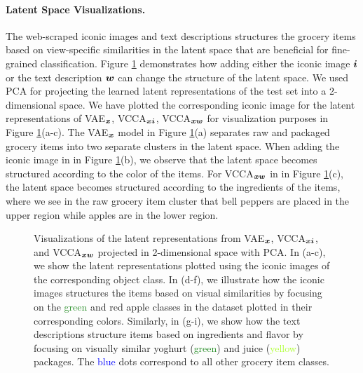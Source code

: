 \vspace{-3mm}
\paragraph{Latent Space Visualizations.} The web-scraped iconic images and text descriptions structures the grocery items based on view-specific similarities in the latent space that are beneficial for fine-grained classification. Figure \ref{fig:latent_space_visualizations} demonstrates how adding either the iconic image ${\bm{i}}$ or the text description ${\bm{w}}$ can change the structure of the latent space. We used PCA for projecting the learned latent representations of the test set into a 2-dimensional space. We have plotted the corresponding iconic image for the latent representations of VAE$_{{\bm{x}}}$, VCCA$_{{\bm{x}} {\bm{i}}}$, VCCA$_{{\bm{x}} {\bm{w}}}$ for visualization purposes in Figure \ref{fig:latent_space_visualizations}(a-c).  
The VAE$_{{\bm{x}}}$ model in Figure \ref{fig:latent_space_visualizations}(a) separates raw and packaged grocery items into two separate clusters in the latent space. 
When adding the iconic image in in Figure \ref{fig:latent_space_visualizations}(b), we observe that the latent space becomes structured according to the color of the items. 
For VCCA$_{{\bm{x}} {\bm{w}}}$ in in Figure \ref{fig:latent_space_visualizations}(c), the latent space becomes structured according to the ingredients of the items, where we see in the raw grocery item cluster that bell peppers are placed in the upper region while apples are in the lower region. 

\begin{figure}[t]
	\centering
	
	\vspace{-2mm}
	\caption{ Visualizations of the latent representations from VAE$_{\bm{x}}$, VCCA$_{{\bm{x}}{\bm{i}}}$, and VCCA$_{{\bm{x}}{\bm{w}}}$ projected in 2-dimensional space with PCA. In (a-c), we show the latent representations plotted using the iconic images of the corresponding object class. In (d-f), we illustrate how the iconic images structures the items based on visual similarities by focusing on the \textcolor{ForestGreen}{green} and \textcolor{RedOrange}{red} apple classes in the dataset plotted in their corresponding colors. Similarly, in (g-i), we show how the text descriptions structure items based on ingredients and flavor by focusing on visually similar yoghurt (\textcolor{ForestGreen}{green}) and juice (\textcolor{GreenYellow}{yellow}) packages. The \textcolor{blue}{blue} dots correspond to all other grocery item classes. } 
	\label{fig:latent_space_visualizations}
	\vspace{-3mm}
\end{figure}

